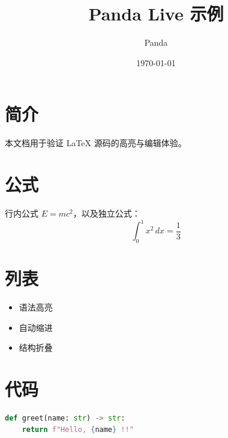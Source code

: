 \documentclass[fontset=fandol]{ctexart}
\title{Panda Live 示例}
\author{Panda}
\date{\today}
\begin{document}
\maketitle

\section{简介}
本文档用于验证 LaTeX{} 源码的高亮与编辑体验。

\section{公式}
行内公式 $E = mc^2$，以及独立公式：
\begin{equation}
  \int_0^1 x^2 \, dx = \frac{1}{3}
\end{equation}

\section{列表}
\begin{itemize}
  \item 语法高亮
  \item 自动缩进
  \item 结构折叠
\end{itemize}

\section{代码}
\begin{lstlisting}[language=Python]
def greet(name: str) -> str:
    return f"Hello, {name} !!"
\end{lstlisting}
\end{document}
